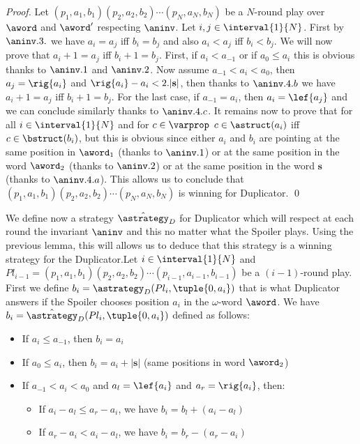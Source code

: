 \begin{proof}
Let $(p_1,a_1,b_1)(p_2,a_2,b_2)\cdots(p_N,a_N,b_N)$ be a $N$-round play over $\aword$ and $\aword'$ respecting $\aninv$. Let $i,j \in \interval{1}{N}$. First by $\aninv.3.$ we have $a_i=a_j$ iff $b_i=b_j$ and also $a_i < a_j$ iff $b_i < b_j$. We will now prove that $a_i+1=a_j$ iff $b_i+1=b_j$. First, if $a_i < a_{-1}$  or if  $a_0 \leq a_i$ this is obvious thanks to $\aninv.1$ and $\aninv.2$. Now assume $a_{-1} < a_i < a_0$, then $a_j=\rig{a_i}$ and $\rig{a_i}-{a_i} < 2.|\mathbf{s}|$, then thanks to $\aninv.4.b$ we have $a_i+1=a_j$ iff $b_i+1=b_j$.  For the last case, if $a_{-1} = a_i$, then $a_i=\lef{a_j}$ and we can conclude similarly thanks to $\aninv.4.c$. It remains now to prove that for all $i \in \interval{1}{N}$ and for $c\in \varprop$ $c\in \astruct(a_i)$ iff $c\in \bstruct(b_i)$, but this is obvious since either $a_i$ and $b_i$ are pointing at the same position in $\aword_1$ (thanks to $\aninv.1$) or at the same position in the word $\aword_2$ (thanks to $\aninv.2$) or at the same position in the word $\mathbf{s}$ (thanks to  $\aninv.4.a$). This allows us to conclude that $(p_1,a_1,b_1)(p_2,a_2,b_2)\cdots(p_N,a_N,b_N)$ is winning for Duplicator. \qed
\end{proof}
We define now a strategy $\hat\astrategy_D$ for Duplicator which will respect at each round the invariant $\aninv$ and this no matter what the Spoiler plays. Using the previous lemma, this will allows us to deduce that this strategy is a winning strategy for the Duplicator.Let $i \in \interval{1}{N}$ and $Pl_{i-1}=(p_1,a_1,b_1)(p_2,a_2,b_2)\cdots(p_{i-1},a_{i-1},b_{i-1})$ be a $(i-1)$-round play. First we define $b_i=\astrategy_D(Pl_i,\tuple{0,a_i})$ that is what Duplicator answers if the Spoiler chooses position $a_i$ in the $\omega$-word $\aword$. We have $b_i=\hat\astrategy_D(Pl_i,\tuple{0,a_i})$ defined as follows:
\begin{itemize}
\item If $a_i\leq a_{-1}$, then $b_i=a_i$
\item If $a_0 \leq a_{i}$, then $b_i=a_i+|\mathbf{s}|$ (same positions in word $\aword_2$)
\item If $a_{-1} < a_i < a_0$ and $a_l=\lef{a_i}$ and $a_r=\rig{a_i}$, then:
\begin{itemize}
\item  If $a_i-a_l \leq a_r-a_i$, we have $b_i=b_l+(a_i-a_l)$
\item  If $a_r-a_i < a_i-a_l$, we have $b_i=b_r-(a_r-a_i)$
\end{itemize}
\end{itemize}
